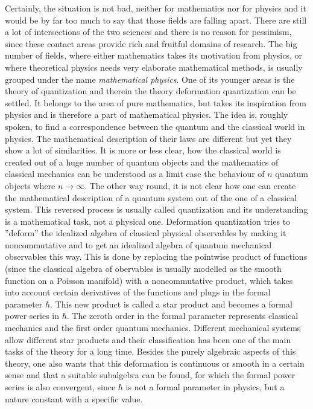 Certainly, the situation is not bad, neither for mathematics nor for physics and it would be by far too much to say that those fields are falling apart. There are still a lot of intersections of the two sciences and there is no reason for pessimism, since these contact areas provide rich and fruitful domains of research. The big number of fields, where either mathematics takes its motivation from physics, or where theoretical physics needs very elaborate mathematical methods, is usually grouped under the name \emph{mathematical physics}. One of its younger areas is the theory of quantization and therein the theory deformation quantization can be settled. It belongs to the area of pure mathematics, but takes its inspiration from physics and is therefore a part of mathematical physics. The idea is, roughly spoken, to find a correspondence between the quantum and the classical world in physics. The mathematical description of their laws are different but yet they show a lot of similarities. It is more or less clear, how the classical world is created out of a huge number of quantum objects and the mathematics of classical mechanics can be understood as a limit case the behaviour of $n$ quantum objects where $n \longrightarrow \infty$. The other way round, it is not clear how one can create the mathematical description of a quantum system out of the one of a classical system. This reversed process is usually called quantization and its understanding is a mathematical task, not a physical one. Deformation quantization tries to ''deform'' the idealized algebra of classical physical observables by making it noncommutative and to get an idealized algebra of quantum mechanical observables this way. This is done by replacing the pointwise product of functions (since the classical algebra of obervables is usually modelled as the smooth function on a Poisson manifold) with a noncommutative product, which takes into account certain derivatives of the functions and plugs in the formal parameter $\hbar$. This new product is called a star product and becomes a formal power series in $\hbar$. The zeroth order in the formal parameter represents classical mechanics and the first order quantum mechanics. Different mechanical systems allow different star products and their classification has been one of the main tasks of the theory for a long time. Besides the purely algebraic aspects of this theory, one also wants that this deformation is continuous or smooth in a certain sense and that a suitable subalgebra can be found, for which the formal power series is also convergent, since $\hbar$ is not a formal parameter in physics, but a nature constant with a specific value.


